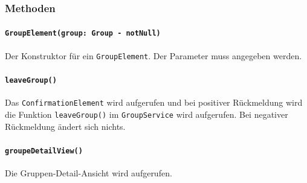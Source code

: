 \documentclass{entwurfsheft}
\begin{document}
        \subsubsection*{Methoden}
            \paragraph*{\texttt{GroupElement(group: Group - notNull)}} Der Konstruktor für ein \texttt{GroupElement}. Der Parameter muss angegeben werden.
            \paragraph*{\texttt{leaveGroup()}} Das \texttt{ConfirmationElement} wird aufgerufen und bei positiver Rückmeldung wird die Funktion \texttt{leaveGroup()} im \texttt{GroupService} wird aufgerufen. Bei negativer Rückmeldung ändert sich nichts.
            \paragraph*{\texttt{groupeDetailView()}} Die Gruppen-Detail-Ansicht wird aufgerufen.
            
\end{document}

